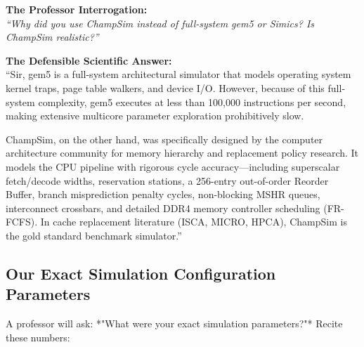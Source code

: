 \documentclass[11pt, a4paper]{article}
\begin{document}
\begin{trapbox}
\textbf{The Professor Interrogation:}\\
\textit{``Why did you use ChampSim instead of full-system gem5 or Simics? Is ChampSim realistic?''}
\end{trapbox}

\begin{answerbox}
\textbf{The Defensible Scientific Answer:}\\
``Sir, gem5 is a full-system architectural simulator that models operating system kernel traps, page table walkers, and device I/O. However, because of this full-system complexity, gem5 executes at less than 100,000 instructions per second, making extensive multicore parameter exploration prohibitively slow.

ChampSim, on the other hand, was specifically designed by the computer architecture community for memory hierarchy and replacement policy research. It models the CPU pipeline with rigorous cycle accuracy---including superscalar fetch/decode widths, reservation stations, a 256-entry out-of-order Reorder Buffer, branch misprediction penalty cycles, non-blocking MSHR queues, interconnect crossbars, and detailed DDR4 memory controller scheduling (FR-FCFS). In cache replacement literature (ISCA, MICRO, HPCA), ChampSim is the gold standard benchmark simulator.''
\end{answerbox}

\subsection{Our Exact Simulation Configuration Parameters}
A professor will ask: *"What were your exact simulation parameters?"* Recite these numbers:
\end{document}
